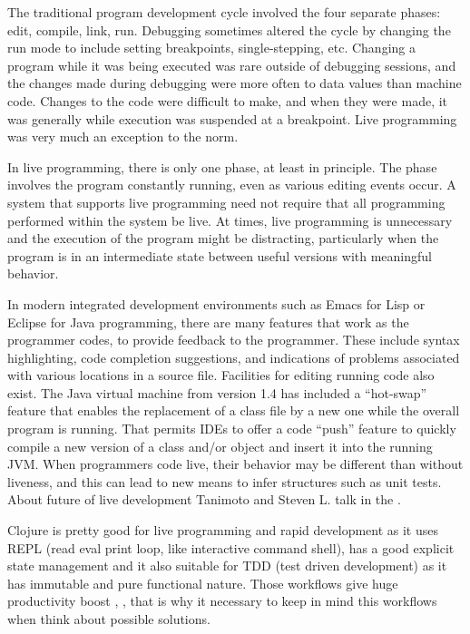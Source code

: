 The traditional program development cycle involved the four separate phases:
edit, compile, link, run. Debugging sometimes altered the cycle by changing the
run mode to include setting breakpoints, single-stepping, etc. Changing a
program while it was being executed was rare outside of debugging sessions, and
the changes made during debugging were more often to data values than machine
code. Changes to the code were difficult to make, and when they were made, it
was generally while execution was suspended at a breakpoint. Live programming
was very much an exception to the norm.

In live programming, there is only one phase, at least in principle. The phase
involves the program constantly running, even as various editing events occur. A
system that supports live programming need not require that all programming
performed within the system be live. At times, live programming is unnecessary
and the execution of the program might be distracting, particularly when the
program is in an intermediate state between useful versions with meaningful
behavior.

In modern integrated development environments such as Emacs for Lisp or Eclipse
for Java programming, there are many features that work as the programmer codes,
to provide feedback to the programmer. These include syntax highlighting, code
completion suggestions, and indications of problems associated with various
locations in a source file. Facilities for editing running code also exist. The
Java virtual machine from version 1.4 has included a “hot-swap” feature that
enables the replacement of a class file by a new one while the overall program
is running. That permits IDEs to offer a code “push” feature to quickly compile
a new version of a class and/or object and insert it into the running JVM. When
programmers code live, their behavior may be different than without liveness,
and this can lead to new means to infer structures such as unit tests. About
future of live development Tanimoto and Steven L. talk in the
\cite{tanimoto2013perspective}.

Clojure is pretty good for live programming and rapid development as it uses
REPL (read eval print loop, like interactive command shell), has a good explicit
state management and it also suitable for TDD (test driven development) as it
has immutable and pure functional nature. Those workflows give huge productivity
boost \cite{madeyski2007impact}, \cite{tanimoto2013perspective}, that is why it
necessary to keep in mind this workflows when think about possible solutions.


